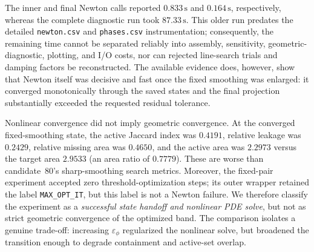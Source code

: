\begin{table}[htbp]
  \centering
  \caption{Newton behavior for adaptive-search candidate~80 and its direct
  fixed-pair handoff. The search row and the handoff rows use the same
  thresholds but different smoothing. Iteration counts are the solver's
  reported counts; the storyboard stores accepted states rather than every
  trial or backtrack.}
  \label{tab:iter-candidate80-newton}
\end{table}

The inner and final Newton calls reported $0.833\,\mathrm{s}$ and
$0.164\,\mathrm{s}$, respectively, whereas the complete diagnostic run took
$87.33\,\mathrm{s}$. This older run predates the detailed
\texttt{newton.csv} and \texttt{phases.csv} instrumentation; consequently,
the remaining time cannot be separated reliably into assembly, sensitivity,
geometric-diagnostic, plotting, and I/O costs, nor can rejected line-search
trials and damping factors be reconstructed. The available evidence does,
however, show that Newton itself was decisive and fast once the fixed
smoothing was enlarged: it converged monotonically through the saved states
and the final projection substantially exceeded the requested residual
tolerance.

Nonlinear convergence did not imply geometric convergence. At the converged
fixed-smoothing state, the active Jaccard index was $0.4191$, relative leakage
was $0.2429$, relative missing area was $0.4650$, and the active area was
$2.2973$ versus the target area $2.9533$ (an area ratio of $0.7779$). These
are worse than candidate~80's sharp-smoothing search metrics. Moreover, the
fixed-pair experiment accepted zero threshold-optimization steps; its outer
wrapper retained the label \texttt{MAX\_OPT\_IT}, but this label is not a
Newton failure. We therefore classify the experiment as a \emph{successful
state handoff and nonlinear PDE solve}, but not as strict geometric
convergence of the optimized band. The comparison isolates a genuine
trade-off: increasing $\varepsilon_\phi$ regularized the nonlinear solve, but
broadened the transition enough to degrade containment and active-set overlap.

